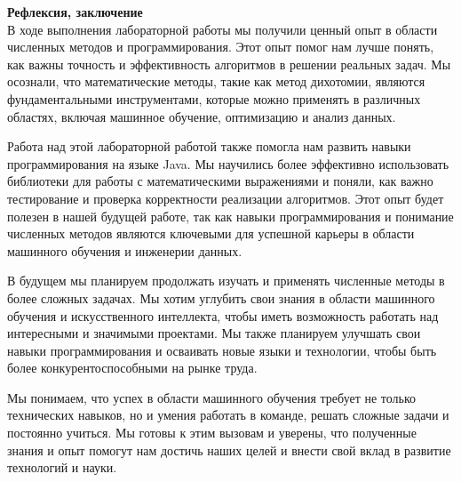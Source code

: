 \textbf{Рефлексия, заключение}
\\

В ходе выполнения лабораторной работы мы получили ценный опыт в области численных методов и программирования. Этот опыт помог нам лучше понять, как важны точность и эффективность алгоритмов в решении реальных задач. Мы осознали, что математические методы, такие как метод дихотомии, являются фундаментальными инструментами, которые можно применять в различных областях, включая машинное обучение, оптимизацию и анализ данных.

Работа над этой лабораторной работой также помогла нам развить навыки \\программирования на языке Java. Мы научились более эффективно использовать библиотеки для работы с математическими выражениями и поняли, как важно тестирование и проверка корректности реализации алгоритмов. Этот опыт будет полезен в нашей будущей работе, так как навыки программирования и понимание численных методов являются ключевыми для успешной карьеры в области машинного обучения и инженерии данных.

В будущем мы планируем продолжать изучать и применять численные методы в более сложных задачах. Мы хотим углубить свои знания в области машинного обучения и искусственного интеллекта, чтобы иметь возможность работать над интересными и значимыми проектами. Мы также планируем улучшать свои навыки программирования и осваивать новые языки и технологии, чтобы быть более конкурентоспособными на рынке труда.

Мы понимаем, что успех в области машинного обучения требует не только технических навыков, но и умения работать в команде, решать сложные задачи и постоянно учиться. Мы готовы к этим вызовам и уверены, что полученные знания и опыт помогут нам достичь наших целей и внести свой вклад в развитие технологий и науки.
